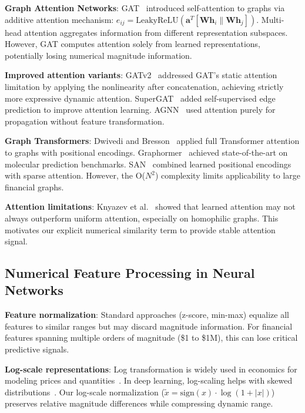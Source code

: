 \textbf{Graph Attention Networks}: GAT~\cite{velivckovic2018gat} introduced self-attention to graphs via additive attention mechanism: $e_{ij} = \text{LeakyReLU}(\mathbf{a}^T[\mathbf{Wh}_i \| \mathbf{Wh}_j])$. Multi-head attention aggregates information from different representation subspaces. However, GAT computes attention solely from learned representations, potentially losing numerical magnitude information.

\textbf{Improved attention variants}: GATv2~\cite{brody2022gatv2} addressed GAT's static attention limitation by applying the nonlinearity after concatenation, achieving strictly more expressive dynamic attention. SuperGAT~\cite{kim2021supergat} added self-supervised edge prediction to improve attention learning. AGNN~\cite{thekumparampil2018agnn} used attention purely for propagation without feature transformation.

\textbf{Graph Transformers}: Dwivedi and Bresson~\cite{dwivedi2021graphtransformer} applied full Transformer attention to graphs with positional encodings. Graphormer~\cite{ying2021graphormer} achieved state-of-the-art on molecular prediction benchmarks. SAN~\cite{kreuzer2021san} combined learned positional encodings with sparse attention. However, the O($N^2$) complexity limits applicability to large financial graphs.

\textbf{Attention limitations}: Knyazev et al.~\cite{knyazev2019attention_limits} showed that learned attention may not always outperform uniform attention, especially on homophilic graphs. This motivates our explicit numerical similarity term to provide stable attention signal.

\subsection{Numerical Feature Processing in Neural Networks}

\textbf{Feature normalization}: Standard approaches (z-score, min-max) equalize all features to similar ranges but may discard magnitude information. For financial features spanning multiple orders of magnitude (\$1 to \$1M), this can lose critical predictive signals.

\textbf{Log-scale representations}: Log transformation is widely used in economics for modeling prices and quantities~\cite{wooldridge2016economics}. In deep learning, log-scaling helps with skewed distributions~\cite{bengio2012practical}. Our log-scale normalization ($\tilde{x} = \text{sign}(x) \cdot \log(1+|x|)$) preserves relative magnitude differences while compressing dynamic range.

